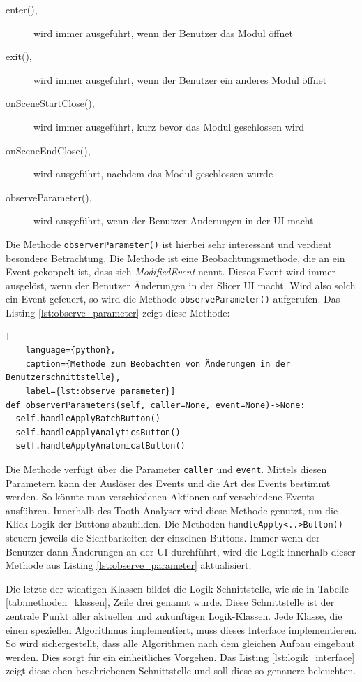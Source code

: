 \begin{description}
	\item[enter(),] wird immer ausgeführt, wenn der Benutzer das Modul öffnet

	\item[exit(),] wird immer ausgeführt, wenn der Benutzer ein anderes Modul
		öffnet

	\item[onSceneStartClose(),] wird immer ausgeführt, kurz bevor das Modul
		geschlossen wird

	\item[onSceneEndClose(),] wird ausgeführt, nachdem das Modul geschlossen wurde

	\item[observeParameter(),] wird ausgeführt, wenn der Benutzer Änderungen in
		der \ac{UI} macht
\end{description}

Die Methode \texttt{observerParameter()} ist hierbei sehr interessant und
verdient besondere Betrachtung. Die Methode ist eine Beobachtungsmethode, die an
ein Event gekoppelt ist, dass sich \textit{ModifiedEvent} nennt. Dieses Event wird
immer ausgelöst, wenn der Benutzer Änderungen in der Slicer \ac{UI} macht. Wird
also solch ein Event gefeuert, so wird die Methode \texttt{observeParameter()}
aufgerufen. Das Listing \ref{lst:observe_parameter} zeigt diese Methode:

\begin{lstlisting}[
    language={python},
    caption={Methode zum Beobachten von Änderungen in der Benutzerschnittstelle},
    label={lst:observe_parameter}]
def observerParameters(self, caller=None, event=None)->None:
  self.handleApplyBatchButton()
  self.handleApplyAnalyticsButton()
  self.handleApplyAnatomicalButton()
\end{lstlisting}

Die Methode verfügt über die Parameter \texttt{caller} und \texttt{event}. Mittels
diesen Parametern kann der Auslöser des Events und die Art des Events bestimmt werden.
So könnte man verschiedenen Aktionen auf verschiedene Events ausführen. Innerhalb
des Tooth Analyser wird diese Methode genutzt, um die Klick-Logik der Buttons
abzubilden. Die Methoden \texttt{handleApply<..>Button()} steuern jeweils die
Sichtbarkeiten der einzelnen Buttons. Immer wenn der Benutzer dann Änderungen an
der \ac{UI} durchführt, wird die Logik innerhalb dieser Methode aus Listing \ref{lst:observe_parameter}
aktualisiert.

Die letzte der wichtigen Klassen bildet die Logik-Schnittstelle, wie sie in
Tabelle \ref{tab:methoden_klassen}, Zeile drei genannt wurde. Diese
Schnittstelle ist der zentrale Punkt aller aktuellen und zukünftigen Logik-Klassen.
Jede Klasse, die einen speziellen Algorithmus implementiert, muss dieses Interface
implementieren. So wird sichergestellt, dass alle Algorithmen nach dem gleichen Aufbau
eingebaut werden. Dies sorgt für ein einheitliches Vorgehen. Das Listing \ref{lst:logik_interface}
zeigt diese eben beschriebenen Schnittstelle und soll diese so genauere beleuchten.

